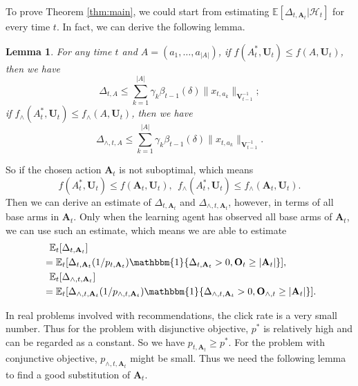 \documentclass{article}
\newcommand{\EE}{\mathbb{E}}
\newcommand{\bOne}{\mathbbm{1}}
\newcommand{\bA}{\mathbf{A}}
\newcommand{\bO}{\mathbf{O}}
\newcommand{\bU}{\mathbf{U}}
\newcommand{\bV}{\mathbf{V}}
\newcommand{\cH}{\mathcal{H}}
\newcommand{\abs}[1]{\left| #1 \right|}
\newcommand{\norm}[1]{\| #1 \|}
\newtheorem{lemma}[theorem]{Lemma}%
\newcommand{\wei}[1]{}
\newcommand{\wei}[1]{{\color{blue!50!black}  [\text{Wei:} #1]}}
\begin{document}
\wei{Is the $\log$ in the above theorem with base $2$? 
	Other UCB regret bounds usually has $\ln$. Please double check if here
	indeed we use $\log$ of base 2. }
To prove Theorem \ref{thm:main}, we could start from estimating $\EE[\Delta_{t, \bA_t}|\cH_t]$ for every time $t$. In fact, we can derive the following lemma.
\wei{I did not see $\Delta_{t,\bA_t}$ defined before.}
\begin{lemma}
\label{lem:DeltaEstimate}
For any time $t$ and $A = (a_1, \ldots, a_{\abs{A}})$, if $f(A_t^*, \bU_t) \leq f(A, \bU_t)$, then we have
$$
\Delta_{t,A} \leq \sum_{k=1}^{\abs{A}} \gamma_k \beta_{t-1}(\delta)\norm{x_{t,a_k}}_{\bV_{t-1}^{-1}};
$$
if $f_{\wedge}(A_t^*, \bU_t) \leq f_{\wedge}(A, \bU_t)$, then we have
$$
\Delta_{\wedge, t,A} \leq \sum_{k=1}^{\abs{A}} \gamma_k \beta_{t-1}(\delta)\norm{x_{t,a_k}}_{\bV_{t-1}^{-1}}.
$$
\end{lemma}

So if the chosen action $\bA_t$ is not suboptimal, which means
$$
f(A_t^*, \bU_t) \leq f(\bA_t, \bU_t), ~~ f_{\wedge}(A_t^*, \bU_t) \leq f_{\wedge}(\bA_t, \bU_t).
$$
Then we can derive an estimate of $\Delta_{t, \bA_t}$ and $\Delta_{\wedge, t, \bA_t}$, however, in terms of all base arms in $\bA_t$. Only when the learning agent has observed all base arms of $\bA_t$, we can use such an estimate, which means we are able to estimate
\begin{align*}
&~~\EE_t[\Delta_{t, \bA_t}] \\
&= \EE_t[\Delta_{t, \bA_t}(1/p_{t, \bA_t}) \bOne\{\Delta_{t, \bA_t} > 0, \bO_t \geq \abs{\bA_t}\}],\\
&~~\EE_t[\Delta_{\wedge, t, \bA_t}] \\
&= \EE_t[\Delta_{\wedge, t, \bA_t}(1/p_{\wedge, t, \bA_t}) \bOne\{\Delta_{\wedge, t, \bA_t} > 0, \bO_{\wedge, t} \geq \abs{\bA_t}\}].
\end{align*}

In real problems involved with recommendations, the click rate is a very small number. Thus for the problem with disjunctive objective, $p^*$ is relatively high and can be regarded as a constant. So we have $p_{t, \bA_t} \geq p^*$. For the problem with conjunctive objective, $p_{\wedge, t, \bA_t}$ might be small. Thus we need the following lemma to find a good substitution of $\bA_t$.
\end{document}
